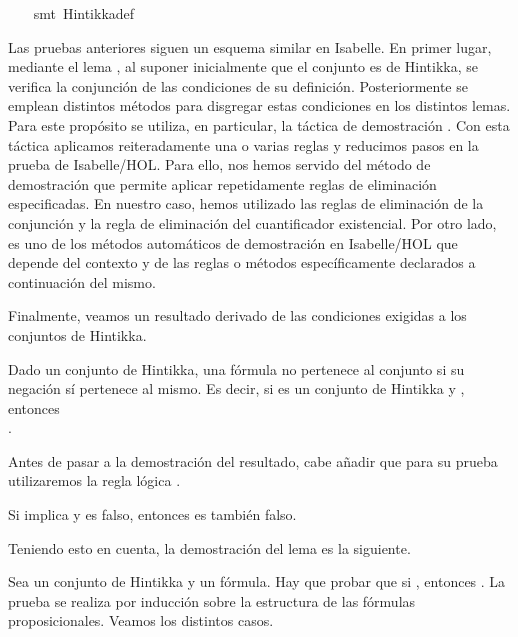 \begin{isabellebody}
%
\isadelimproof
\ \ %
\endisadelimproof
%
\isatagproof
{}\isamarkupfalse%
\ {\isacharparenleft}smt\ Hintikka{\isacharunderscore}def{\isacharparenright}%
\endisatagproof
{\isafoldproof}%
%
\isadelimproof
%
\endisadelimproof
%
\begin{isamarkuptext}%
Las pruebas anteriores siguen un esquema similar en Isabelle. 
  En primer lugar, mediante el lema , al suponer inicialmente
  que el conjunto es de Hintikka, se verifica la conjunción de las 
  condiciones de su definición. Posteriormente se emplean distintos
  métodos para disgregar estas condiciones en los distintos lemas. Para 
  este propósito se utiliza, en particular, la táctica de 
  demostración . Con esta táctica aplicamos
  reiteradamente una o varias reglas y reducimos pasos en la prueba de 
  Isabelle/HOL. Para ello, nos hemos servido del método de demostración 
   que permite aplicar repetidamente reglas de 
  eliminación especificadas. En nuestro caso, hemos utilizado las reglas 
  de eliminación de la conjunción y la regla de eliminación del 
  cuantificador existencial. Por otro lado,  es uno de los 
  métodos automáticos de demostración en Isabelle/HOL que 
  depende del contexto y de las reglas o métodos específicamente 
  declarados a continuación del mismo. 

  Finalmente, veamos un resultado derivado de las condiciones
  exigidas a los conjuntos de Hintikka.

  \begin{lema}
    Dado un conjunto de Hintikka, una fórmula no pertenece al conjunto 
    si su negación sí pertenece al mismo. Es decir, si  es un 
    conjunto de Hintikka y , entonces\\ .
  \end{lema}

  Antes de pasar a la demostración del resultado, cabe añadir que
  para su prueba utilizaremos la regla lógica . 

  \begin{lema}
   Si  implica  y  es falso, entonces  es también falso.
  \end{lema}

  Teniendo esto en cuenta, la demostración del lema es la siguiente.

\begin{demostracion}
   Sea  un conjunto de Hintikka y  un fórmula. Hay que probar
   que si , entonces . 
   La prueba se realiza por inducción sobre la estructura de las 
   fórmulas proposicionales. Veamos los distintos casos.


\end{demostracion}
\end{isamarkuptext}
\end{isabellebody}
